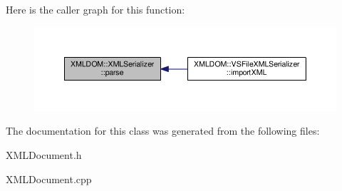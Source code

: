 Here is the caller graph for this function\+:
\nopagebreak
\begin{figure}[H]
\begin{center}
\leavevmode
\includegraphics[width=350pt]{d2/ddd/classXMLDOM_1_1XMLSerializer_abea28fce905d61d5b89c987f01808335_icgraph}
\end{center}
\end{figure}




The documentation for this class was generated from the following files\+:\begin{DoxyCompactItemize}
\item 
X\+M\+L\+Document.\+h\item 
X\+M\+L\+Document.\+cpp\end{DoxyCompactItemize}
